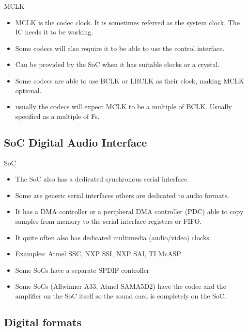 \begin{frame}{MCLK}
  \begin{itemize}
  \item MCLK is the codec clock. It is sometimes referred as the
    system clock. The IC needs it to be working.
  \item Some codecs will also require it to be able to use the
    control interface.
  \item Can be provided by the SoC when it has suitable clocks or a
    crystal.
  \item Some codecs are able to use BCLK or LRCLK as their clock,
    making MCLK optional.
  \item usually the codecs will expect MCLK to be a multiple of BCLK.
    Usually specified as a multiple of Fs.
  \end{itemize}
\end{frame}

\subsection{SoC Digital Audio Interface}

\begin{frame}{SoC}
  \begin{itemize}
  \item The SoC also has a dedicated synchronous serial interface.
  \item Some are generic serial interfaces others are dedicated to audio
    formats.
  \item It has a DMA controller or a peripheral DMA controller (PDC)
    able to copy samples from memory to the serial interface registers
    or FIFO.
  \item It quite often also has dedicated multimedia (audio/video) clocks.
  \item Examples: Atmel SSC, NXP SSI, NXP SAI, TI McASP
  \item Some SoCs have a separate SPDIF controller
  \item Some SoCs (Allwinner A33, Atmel SAMA5D2) have the codec and
    the amplifier on the SoC itself so the sound card is completely on
    the SoC.
  \end{itemize}
\end{frame}

\subsection{Digital formats}

